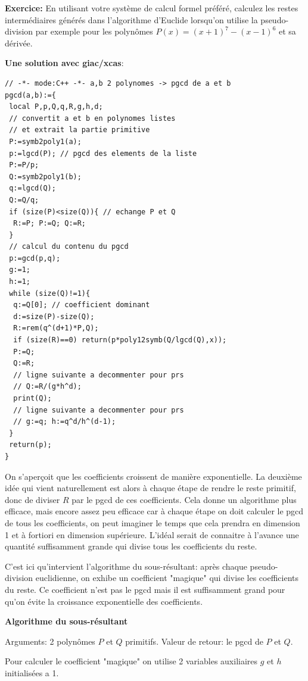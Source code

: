 \documentclass[a4paper,11pt]{article}
\begin{document}
{\bf{Exercice:}} En utilisant votre système de calcul formel préféré,
calculez les restes intermédiaires générés dans l'algorithme d'Euclide
lorsqu'on utilise la pseudo-division par exemple pour les polynômes $P ( x ) =
( x + 1 )^7 - ( x - 1 )^6$ et sa dérivée.

{\bf{Une solution avec giac/xcas}}:
\begin{verbatim}
// -*- mode:C++ -*- a,b 2 polynomes -> pgcd de a et b
pgcd(a,b):={ 
 local P,p,Q,q,R,g,h,d;
 // convertit a et b en polynomes listes 
 // et extrait la partie primitive   
 P:=symb2poly1(a);
 p:=lgcd(P); // pgcd des elements de la liste
 P:=P/p; 
 Q:=symb2poly1(b);
 q:=lgcd(Q);
 Q:=Q/q; 
 if (size(P)<size(Q)){ // echange P et Q
  R:=P; P:=Q; Q:=R; 
 } 
 // calcul du contenu du pgcd
 p:=gcd(p,q);
 g:=1;
 h:=1;
 while (size(Q)!=1){
  q:=Q[0]; // coefficient dominant
  d:=size(P)-size(Q);
  R:=rem(q^(d+1)*P,Q);
  if (size(R)==0) return(p*poly12symb(Q/lgcd(Q),x));
  P:=Q;
  Q:=R;
  // ligne suivante a decommenter pour prs 
  // Q:=R/(g*h^d);
  print(Q);
  // ligne suivante a decommenter pour prs 
  // g:=q; h:=q^d/h^(d-1);
 } 
 return(p);
}
\end{verbatim}
On s'aperçoit que les coefficients croissent de manière exponentielle. La
deuxième idée qui vient naturellement est alors à chaque étape de rendre le
reste primitif, donc de diviser $R$ par le pgcd de ces coefficients. Cela
donne un algorithme plus efficace, mais encore assez peu efficace car à chaque
étape on doit calculer le pgcd de tous les coefficients, on peut imaginer le
temps que cela prendra en dimension 1 et à fortiori en dimension supérieure.
L'idéal serait de connaitre à l'avance une quantité suffisamment grande qui
divise tous les coefficients du reste.

C'est ici qu'intervient l'algorithme du sous-résultant: après chaque
pseudo-division euclidienne, on exhibe un coefficient "magique" qui divise les
coefficients du reste. Ce coefficient n'est pas le pgcd mais il est
suffisamment grand pour qu'on évite la croissance exponentielle des
coefficients.



{\bf{Algorithme du sous-résultant}}

Arguments: 2 polynômes $P$ et $Q$ primitifs. Valeur de retour: le pgcd de $P$
et $Q$.

Pour calculer le coefficient "magique" on utilise 2 variables auxiliaires $g$
et $h$ initialisées a 1.
\end{document}
